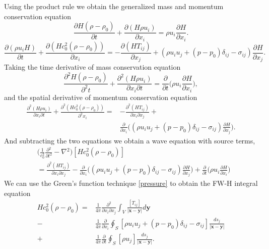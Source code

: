 \documentclass[a4paper]{article}
\begin{document}
Using the product rule we obtain the generalized mass and momentum conservation equation
\begin{equation}
	\frac{\partial H(\rho - \rho_{0})}{\partial t} + \frac{\partial (H\rho u_{i})}{\partial x_{i}} = \rho u_{i}\frac{\partial H}{\partial x_{i}}.
\end{equation}
\begin{equation}
	\frac{\partial (\rho u_{i}H)}{\partial t} + \frac{\partial (Hc_{0}^2 (\rho - \rho_{0}))  }{\partial x_{i}} = -\frac{\partial (HT_{ij}) }{\partial x_{j}} + (\rho u_{i}u_{j} + (p - p_{0})\delta_{ij} - \sigma_{ij})\frac{\partial H}{\partial x_{j}}.
\end{equation}
Taking the time derivative of mass conservation equation
\begin{equation}
	\frac{\partial^2 H(\rho - \rho_{0})}{\partial^2 t} + \frac{\partial^2 (H\rho u_{i})}{\partial x_{i}\partial t} = \frac{\partial}{\partial t}\Bigg(\rho u_{i}\frac{\partial H}{\partial x_{i}}\Bigg),
\end{equation}
and the spatial derivative of momentum conservation equation
\begin{equation}
	\begin{split}
		\frac{\partial^2 (H\rho u_{i})}{\partial x_{i}\partial t} + \frac{\partial^2 (Hc_{0}^2 (\rho - \rho_{0}))  }{\partial^2 x_{i}} =& -\frac{\partial^2 (HT_{ij}) }{\partial x_{i}\partial x_{j}} + \\
		&\frac{\partial}{\partial x_{i}}\Big((\rho u_{i}u_{j} + (p - p_{0})\delta_{ij} - \sigma_{ij})\frac{\partial H}{\partial x_{j}}\Big).
	\end{split}
\end{equation}
And subtracting the two equations we obtain a wave equation with source terms,
\begin{equation}
	\begin{split}
		&\Bigg( \frac{1}{c_{0}^2}\frac{\partial{}^{2}}{\partial{t}^{2}}- \nabla{}^{2} \Bigg) [Hc_{0}^{2}(\rho - \rho_{0})] \\& = \frac{\partial^2 (HT_{ij}) }{\partial x_{i}\partial x_{j}} - \frac{\partial}{\partial x_{i}}\Big((\rho u_{i}u_{j} + (p - p_{0})\delta_{ij} - \sigma_{ij})\frac{\partial H}{\partial x_{j}}\Big) + \frac{\partial}{\partial t}\Bigg(\rho u_{i}\frac{\partial H}{\partial x_{i}}\Bigg)
	\end{split}
\end{equation}
We can use the Green's function technique \ref{pressure} to obtain the FW-H integral equation
\begin{equation}
	\begin{split}
		Hc_{0}^{2}(\rho - \rho_{0}) =& \frac{1}{4\pi}\frac{\partial^2 }{\partial x_{i}\partial x_{j}}\int_{V} \frac{[T_{ij}]}{|\mathbf{x} - \mathbf{y}|}d\mathbf{y}\\
		-& \frac{1}{4\pi}\frac{\partial}{\partial x_{i}} \oint_{S} [\rho u_{i}u_{j} + (p - p_{0})\delta_{ij} - \sigma_{ij}]\frac{ds_{j}}{|\mathbf{x} - \mathbf{y}|}\\
		+& \frac{1}{4\pi}\frac{\partial}{\partial t}\oint_{S}[\rho u_{j}]\frac{ds_{j}}{|\mathbf{x} - \mathbf{y}|}.
	\end{split}
\end{equation}
\end{document}
